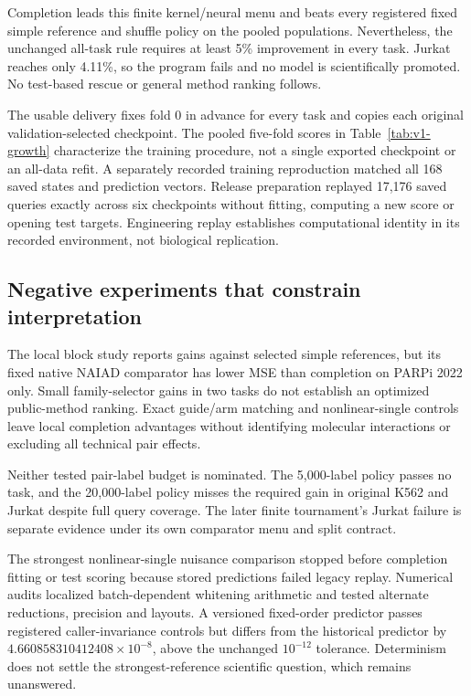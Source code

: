 \documentclass{article}
\begin{document}
Completion leads this finite kernel/neural menu and beats every registered fixed simple reference and shuffle policy on the pooled populations. Nevertheless, the unchanged all-task rule requires at least 5\% improvement in every task. Jurkat reaches only 4.11\%, so the program fails and no model is scientifically promoted. No test-based rescue or general method ranking follows.

The usable delivery fixes fold 0 in advance for every task and copies each original validation-selected checkpoint. The pooled five-fold scores in Table~\ref{tab:v1-growth} characterize the training procedure, not a single exported checkpoint or an all-data refit. A separately recorded training reproduction matched all 168 saved states and prediction vectors. Release preparation replayed 17,176 saved queries exactly across six checkpoints without fitting, computing a new score or opening test targets. Engineering replay establishes computational identity in its recorded environment, not biological replication.

\subsection{Negative experiments that constrain interpretation}
The local block study reports gains against selected simple references, but its fixed native NAIAD comparator has lower MSE than completion on PARPi 2022 only. Small family-selector gains in two tasks do not establish an optimized public-method ranking. Exact guide/arm matching and nonlinear-single controls leave local completion advantages without identifying molecular interactions or excluding all technical pair effects.

Neither tested pair-label budget is nominated. The 5,000-label policy passes no task, and the 20,000-label policy misses the required gain in original K562 and Jurkat despite full query coverage. The later finite tournament's Jurkat failure is separate evidence under its own comparator menu and split contract.

The strongest nonlinear-single nuisance comparison stopped before completion fitting or test scoring because stored predictions failed legacy replay. Numerical audits localized batch-dependent whitening arithmetic and tested alternate reductions, precision and layouts. A versioned fixed-order predictor passes registered caller-invariance controls but differs from the historical predictor by $4.660858310412408\times10^{-8}$, above the unchanged $10^{-12}$ tolerance. Determinism does not settle the strongest-reference scientific question, which remains unanswered.
\end{document}
